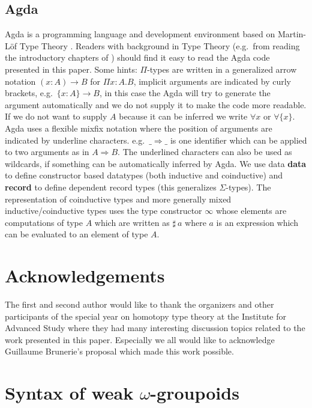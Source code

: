 \documentclass{sig-alternate}
\begin{document}
\subsection*{Agda}\label{Agda}

Agda is a programming language and development environment based on
Martin-Löf Type Theory \cite{agdawiki:main}. Readers with background in
Type Theory (e.g.\ from reading the introductory chapters of
\cite{hott}) should find it easy to read the Agda code presented
in this paper. Some hints: $\Pi$-types are written in a generalized
arrow notation $(x : A) → B$ for $\Pi x:A.B$, implicit arguments are
indicated by curly brackets, e.g.\ $\{x : A\} → B$, in this case the Agda
will try to generate the argument automatically and we do not supply it
to make the code more readable. If we do not want to supply $A$ because
it can be inferred we write $\forall x$ or $\forall\{x\}$.
Agda uses a flexible mixfix notation
where the position of arguments are indicated by underline characters.
e.g.\ $\_⇒\_$ is one identifier which can be applied to two arguments as
in $A ⇒ B$. The underlined characters can also be used as wildcards, if something can be automatically inferred by Agda.
We use data \textbf{data} to define constructor based datatypes (both
inductive and coinductive) and \textbf{record} to define dependent record
types (this generalizes $\Sigma$-types). The representation of
coinductive types and more generally mixed inductive/coinductive types
\cite{txa:mpc2010g}
uses the type constructor $\infty$ whose elements are computations of type
$A$ which are written as $\sharp ~a$ where $a$ is an expression which can be
evaluated to an element of type $A$.

\section*{Acknowledgements}

The first and second author would like to thank the organizers and
other participants of the special year on homotopy type theory at the
Institute for Advanced Study where they had many interesting
discussion topics related to the work presented in this
paper. Especially we all would like to acknowledge Guillaume
Brunerie's proposal which made this work possible. 




\section{Syntax of weak $\omega$-groupoids}\label{sec:syntax}
\end{document}
